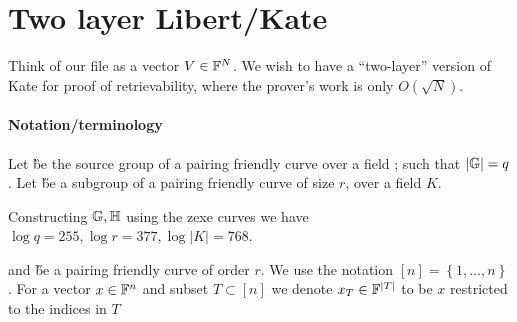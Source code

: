 \documentclass[11pt]{article}
\numberwithin{figure}{section} %
\newtheorem{remark}[thm]{Remark}
\newcommand{\set}[1]{\ensuremath{\left\{#1\right\}}\xspace}
\begin{document}
%  
% 
% 
% 
% 
% 
% 
% 
% 

\section{Two layer Libert/Kate}

Think of our file as a vector $V\in {\mathbb F}^{N}$.
We wish to have a ``two-layer'' version of Kate for proof of retrievability, where the prover's work is only $O(\sqrt{N})$.

\paragraph{Notation/terminology}
Let  \G be the source group of a pairing friendly curve over a field \Fr;
such that $|{\mathbb G}|=q$.
Let \H be a subgroup of a pairing friendly curve of size $r$, over a field $K$.


Constructing ${\mathbb G},{\mathbb H}$ using the zexe curves we have $\log q = 255,\log r = 377, \log |K| = 768$.


and \H be a pairing friendly curve of order $r$.
We use the notation $[n]=\set{1,\ldots,n}$.
For a vector $x\in {\mathbb F}^n$ and subset $T\subset [n]$ we denote $x_T\in {\mathbb F}^{|T|}$ to be $x$ restricted to the indices in $T$
\end{document}
